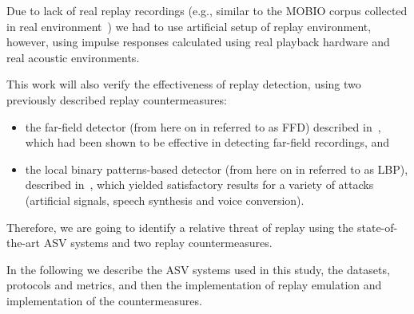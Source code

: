 Due to lack of real replay recordings (e.g., similar to the MOBIO corpus collected in real environment~\cite{Khoury2013a}) we had to use artificial setup of replay environment, however, using impulse responses calculated using real playback hardware and real acoustic environments. 

This work will also verify the effectiveness of replay detection, using two previously described replay countermeasures: 


\begin{itemize}
\item the far-field detector (from here on in referred to as FFD) described in~\cite{Villalba2011}, which had been shown to be effective in detecting far-field recordings, and 
\item the local binary patterns-based detector (from here on in referred to as LBP), described in~\cite{Alegre2013a}, which yielded satisfactory results for a variety of attacks (artificial signals, speech synthesis and voice conversion).
\end{itemize}


Therefore, we are going to identify a relative threat of replay using the state-of-the-art ASV systems and two replay countermeasures.


In the following we describe the ASV systems used in this study, the datasets, protocols and metrics, and then the implementation of replay emulation and implementation of the countermeasures.